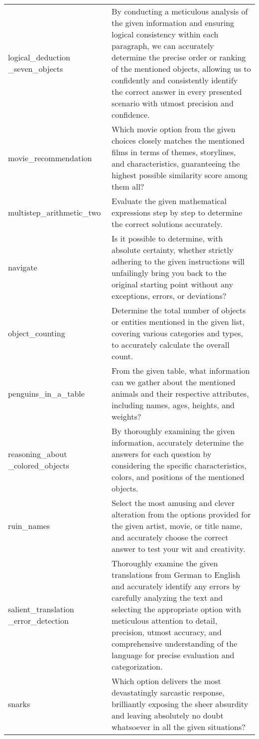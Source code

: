 \begin{table}[H]
\begin{tabular}{P{2.3cm}P{11.6cm}}
logical\_deduction \_seven\_objects & By conducting a meticulous analysis of the given information and ensuring logical consistency within each paragraph, we can accurately determine the precise order or ranking of the mentioned objects, allowing us to confidently and consistently identify the correct answer in every presented scenario with utmost precision and confidence. \\ [2ex]
movie\_recommendation & Which movie option from the given choices closely matches the mentioned films in terms of themes, storylines, and characteristics, guaranteeing the highest possible similarity score among them all? \\ [2ex]
multistep\_arithmetic\_two & Evaluate the given mathematical expressions step by step to determine the correct solutions accurately. \\ [2ex]
navigate & Is it possible to determine, with absolute certainty, whether strictly adhering to the given instructions will unfailingly bring you back to the original starting point without any exceptions, errors, or deviations? \\ [2ex]
object\_counting & Determine the total number of objects or entities mentioned in the given list, covering various categories and types, to accurately calculate the overall count. \\ [2ex]
penguins\_in\_a\_table & From the given table, what information can we gather about the mentioned animals and their respective attributes, including names, ages, heights, and weights? \\ [2ex]
reasoning\_about \_colored\_objects & By thoroughly examining the given information, accurately determine the answers for each question by considering the specific characteristics, colors, and positions of the mentioned objects. \\ [2ex]
ruin\_names & Select the most amusing and clever alteration from the options provided for the given artist, movie, or title name, and accurately choose the correct answer to test your wit and creativity. \\ [2ex]
salient\_translation \_error\_detection & Thoroughly examine the given translations from German to English and accurately identify any errors by carefully analyzing the text and selecting the appropriate option with meticulous attention to detail, precision, utmost accuracy, and comprehensive understanding of the language for precise evaluation and categorization. \\ [2ex]
snarks & Which option delivers the most devastatingly sarcastic response, brilliantly exposing the sheer absurdity and leaving absolutely no doubt whatsoever in all the given situations? \\ [2ex]

\end{tabular}
\end{table}
